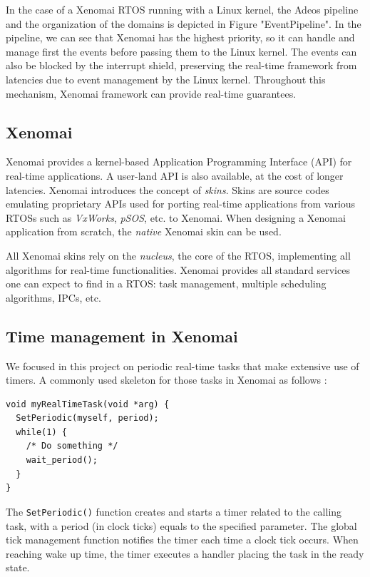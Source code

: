 \documentclass[10pt,a4paper]{article}
\begin{document}
\begin{multicols}{2}
In the case of a Xenomai RTOS running with a Linux kernel, the Adeos pipeline and the organization of the domains is depicted in Figure "EventPipeline". In the pipeline,  we can see that Xenomai has the highest priority, so it can handle and manage first the events before passing them to the Linux kernel. The events can also be blocked by the interrupt shield, preserving the real-time framework from latencies due to event management by the Linux kernel. Throughout this mechanism, Xenomai framework can provide real-time guarantees.

\subsection{Xenomai}

Xenomai provides a kernel-based Application Programming Interface (API) for real-time applications. A user-land API is also available, at the cost of longer latencies. Xenomai introduces the concept of \textit{skins}. Skins are source codes emulating proprietary APIs used for porting real-time applications from various RTOSs such as \textit{VxWorks}, \textit{pSOS}, etc. to Xenomai. When designing a Xenomai application from scratch, the \textit{native} Xenomai skin can be used.

All Xenomai skins rely on the \textit{nucleus}, the core of the RTOS, implementing all algorithms for real-time functionalities. Xenomai provides all standard services one can expect to find in a RTOS: task management, multiple scheduling algorithms, IPCs, etc.

\subsection{Time management in Xenomai}
We focused in this project on periodic real-time tasks that make extensive use of timers. A commonly used skeleton for those tasks in Xenomai as follows :

\begin{verbatim}
void myRealTimeTask(void *arg) {
  SetPeriodic(myself, period);
  while(1) {
    /* Do something */
    wait_period();
  }
}
\end{verbatim}

The \verb+SetPeriodic()+ function creates and starts a timer related to the calling task, with a period (in clock ticks) equals to the specified parameter. The global tick management function notifies the timer each time a clock tick occurs. When reaching wake up time, the timer executes a handler placing the task in the ready state.


\end{multicols}
\end{document}
